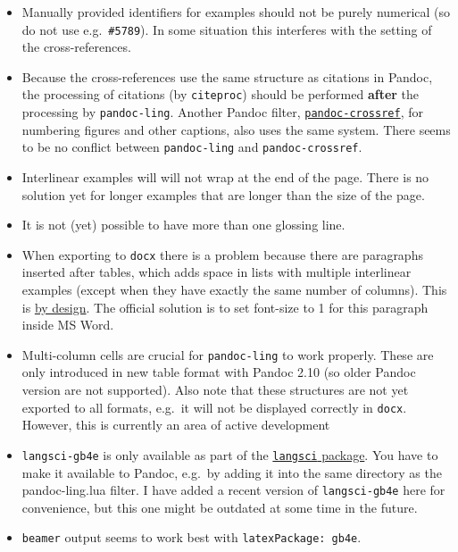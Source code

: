 \documentclass[
]{article}
\providecommand{\tightlist}{%
  \setlength{\itemsep}{0pt}\setlength{\parskip}{0pt}}
\begin{document}
\begin{itemize}
\tightlist
\item
  Manually provided identifiers for examples should not be purely
  numerical (so do not use e.g.~\texttt{\#5789}). In some situation this
  interferes with the setting of the cross-references.
\item
  Because the cross-references use the same structure as citations in
  Pandoc, the processing of citations (by \texttt{citeproc}) should be
  performed \textbf{after} the processing by \texttt{pandoc-ling}.
  Another Pandoc filter,
  \href{https://github.com/lierdakil/pandoc-crossref}{\texttt{pandoc-crossref}},
  for numbering figures and other captions, also uses the same system.
  There seems to be no conflict between \texttt{pandoc-ling} and
  \texttt{pandoc-crossref}.
\item
  Interlinear examples will will not wrap at the end of the page. There
  is no solution yet for longer examples that are longer than the size
  of the page.
\item
  It is not (yet) possible to have more than one glossing line.
\item
  When exporting to \texttt{docx} there is a problem because there are
  paragraphs inserted after tables, which adds space in lists with
  multiple interlinear examples (except when they have exactly the same
  number of columns). This is
  \href{https://answers.microsoft.com/en-us/msoffice/forum/msoffice_word-mso_windows8-mso_2013_release/how-to-remove-extra-paragraph-after-table/995b3811-9f55-4df1-bbbc-9f672b1ad262}{by
  design}. The official solution is to set font-size to 1 for this
  paragraph inside MS Word.
\item
  Multi-column cells are crucial for \texttt{pandoc-ling} to work
  properly. These are only introduced in new table format with Pandoc
  2.10 (so older Pandoc version are not supported). Also note that these
  structures are not yet exported to all formats, e.g.~it will not be
  displayed correctly in \texttt{docx}. However, this is currently an
  area of active development
\item
  \texttt{langsci-gb4e} is only available as part of the
  \href{https://ctan.org/pkg/langsci?lang=en}{\texttt{langsci} package}.
  You have to make it available to Pandoc, e.g.~by adding it into the
  same directory as the pandoc-ling.lua filter. I have added a recent
  version of \texttt{langsci-gb4e} here for convenience, but this one
  might be outdated at some time in the future.
\item
  \texttt{beamer} output seems to work best with
  \texttt{latexPackage:\ gb4e}.
\end{itemize}
\end{document}
